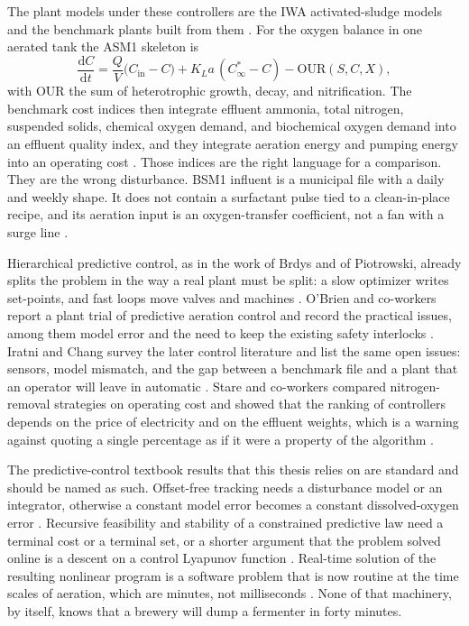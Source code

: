 The plant models under these controllers are the IWA activated-sludge models and the benchmark plants built from them \cite{henze1987asm1,henze2000asm,gernaey2004state,gernaey2014benchmarking,nopens2010bsm2}. For the oxygen balance in one aerated tank the ASM1 skeleton is
\begin{equation}
\label{eq:asm1-do}
\frac{\mathrm{d}C}{\mathrm{d}t}
=
\frac{Q}{V}\bigl(C_{\mathrm{in}}-C\bigr)
+
K_La\,(C^{*}_{\infty}-C)
-
\mathrm{OUR}(S,C,X),
\end{equation}
with $\mathrm{OUR}$ the sum of heterotrophic growth, decay, and nitrification. The benchmark cost indices then integrate effluent ammonia, total nitrogen, suspended solids, chemical oxygen demand, and biochemical oxygen demand into an effluent quality index, and they integrate aeration energy and pumping energy into an operating cost \cite{vanrolleghem2002,copp2002cost,nopens2010bsm2}. Those indices are the right language for a comparison. They are the wrong disturbance. BSM1 influent is a municipal file with a daily and weekly shape. It does not contain a surfactant pulse tied to a clean-in-place recipe, and its aeration input is an oxygen-transfer coefficient, not a fan with a surge line \cite{schraa2017}.

Hierarchical predictive control, as in the work of Brdys and of Piotrowski, already splits the problem in the way a real plant must be split: a slow optimizer writes set-points, and fast loops move valves and machines \cite{brdys2008,piotrowski2008}. O'Brien and co-workers report a plant trial of predictive aeration control and record the practical issues, among them model error and the need to keep the existing safety interlocks \cite{obrien2011}. Iratni and Chang survey the later control literature and list the same open issues: sensors, model mismatch, and the gap between a benchmark file and a plant that an operator will leave in automatic \cite{iratni2019}. Stare and co-workers compared nitrogen-removal strategies on operating cost and showed that the ranking of controllers depends on the price of electricity and on the effluent weights, which is a warning against quoting a single percentage as if it were a property of the algorithm \cite{stare2007}.

The predictive-control textbook results that this thesis relies on are standard and should be named as such. Offset-free tracking needs a disturbance model or an integrator, otherwise a constant model error becomes a constant dissolved-oxygen error \cite{pannocchia2003offset,rawlings2017mpc,maciejowski2002}. Recursive feasibility and stability of a constrained predictive law need a terminal cost or a terminal set, or a shorter argument that the problem solved online is a descent on a control Lyapunov function \cite{mayne2000mpc,qin2003mpc,garcia1989mpc,camacho2007mpc}. Real-time solution of the resulting nonlinear program is a software problem that is now routine at the time scales of aeration, which are minutes, not milliseconds \cite{diehl2002nmpc,andersson2019casadi,wachter2006ipopt,nocedal2006,boyd2004convex}. None of that machinery, by itself, knows that a brewery will dump a fermenter in forty minutes.

